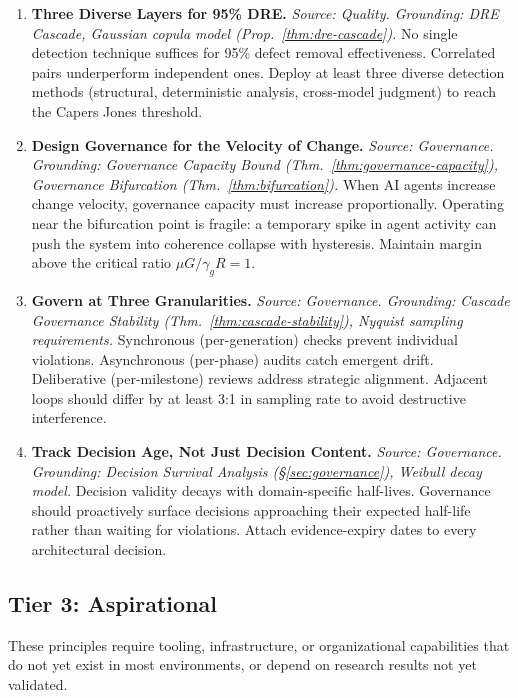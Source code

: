\documentclass[11pt, a4paper, logo, copyright]{googledeepmind}
\begin{document}
\begin{enumerate}[label=\textbf{P\arabic*.}, leftmargin=3em, resume]
\item \textbf{Three Diverse Layers for 95\% DRE.}
\emph{Source: Quality. Grounding: DRE Cascade, Gaussian copula model (Prop.~\ref{thm:dre-cascade}).}
No single detection technique suffices for 95\% defect removal effectiveness. Correlated pairs underperform independent ones. Deploy at least three diverse detection methods (structural, deterministic analysis, cross-model judgment) to reach the Capers Jones threshold.

\item \textbf{Design Governance for the Velocity of Change.}
\emph{Source: Governance. Grounding: Governance Capacity Bound (Thm.~\ref{thm:governance-capacity}), Governance Bifurcation (Thm.~\ref{thm:bifurcation}).}
When AI agents increase change velocity, governance capacity must increase proportionally. Operating near the bifurcation point is fragile: a temporary spike in agent activity can push the system into coherence collapse with hysteresis. Maintain margin above the critical ratio $\mu G / \gamma_g R = 1$.

\item \textbf{Govern at Three Granularities.}
\emph{Source: Governance. Grounding: Cascade Governance Stability (Thm.~\ref{thm:cascade-stability}), Nyquist sampling requirements.}
Synchronous (per-generation) checks prevent individual violations. Asynchronous (per-phase) audits catch emergent drift. Deliberative (per-milestone) reviews address strategic alignment. Adjacent loops should differ by at least 3:1 in sampling rate to avoid destructive interference.

\item \textbf{Track Decision Age, Not Just Decision Content.}
\emph{Source: Governance. Grounding: Decision Survival Analysis (\S\ref{sec:governance}), Weibull decay model.}
Decision validity decays with domain-specific half-lives. Governance should proactively surface decisions approaching their expected half-life rather than waiting for violations. Attach evidence-expiry dates to every architectural decision.

\end{enumerate}

\subsection{Tier 3: Aspirational}
\label{sec:tier3}

These principles require tooling, infrastructure, or organizational capabilities that do not yet exist in most environments, or depend on research results not yet validated.
\end{document}
